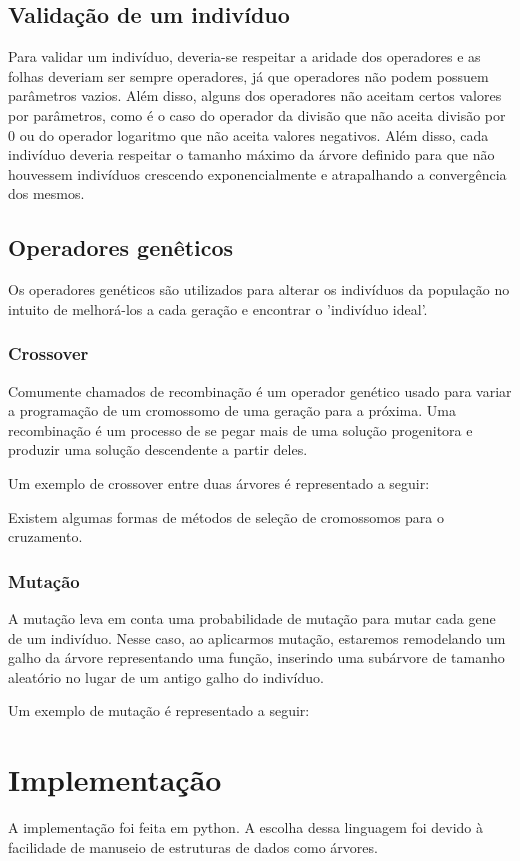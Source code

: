 \documentclass[]{article}
\begin{document}
\subsection{Validação de um indivíduo}
Para validar um indivíduo, deveria-se respeitar a aridade dos operadores e as folhas deveriam ser sempre operadores, já que operadores não podem possuem parâmetros vazios. Além disso, alguns dos operadores não aceitam certos valores por parâmetros, como é o caso do operador da divisão que não aceita divisão por 0 ou do operador logaritmo que não aceita valores negativos. Além disso, cada indivíduo deveria respeitar o tamanho máximo da árvore definido para que não houvessem indivíduos crescendo exponencialmente e atrapalhando a convergência dos mesmos.

\subsection{Operadores genêticos}
Os operadores genéticos são utilizados para alterar os indivíduos da população no intuito de melhorá-los a cada geração e encontrar o 'indivíduo ideal'.  

\subsubsection{Crossover}
Comumente chamados de recombinação é um operador genético usado para variar a programação de um cromossomo de uma geração para a próxima. Uma recombinação é um processo de se pegar mais de uma solução progenitora e produzir uma solução descendente a partir deles. 

Um exemplo de crossover entre duas árvores é representado a seguir: 

Existem algumas formas de métodos de seleção de cromossomos para o cruzamento.  

\subsubsection{Mutação}
A mutação leva em conta uma probabilidade de mutação para mutar cada gene de um indivíduo. Nesse caso, ao aplicarmos mutação, estaremos remodelando um galho da árvore representando uma função, inserindo uma subárvore de tamanho aleatório no lugar de um antigo galho do indivíduo.

Um exemplo de mutação é representado a seguir: 

\section{Implementação}
A implementação foi feita em python. A escolha dessa linguagem foi devido à facilidade de manuseio de estruturas de dados como árvores.
\end{document}
